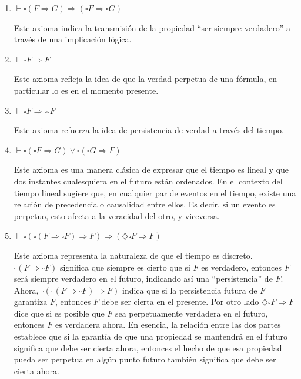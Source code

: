 \begin{enumerate}
    \item $ \vdash \square (F \Rightarrow G) \Rightarrow (\square F \Rightarrow \square G) $
    
    Este axioma indica la transmisión de la propiedad ``ser siempre verdadero'' a través de una implicación lógica.
    
    \item $ \vdash \square F \Rightarrow F $

    Este axioma refleja la idea de que la verdad perpetua de una fórmula, en particular lo es en el momento presente.
    
    \item $ \vdash \square F \Rightarrow \square\square F $

    Este axioma refuerza la idea de persistencia de verdad a través del tiempo.
    
    \item $ \vdash \square (\square F \Rightarrow G) \lor \square(\square G \Rightarrow F) $

    Este axioma es una manera clásica de expresar que el tiempo es lineal y que dos instantes cualesquiera en el futuro están ordenados. En el contexto del tiempo lineal sugiere que, en cualquier par de eventos en el tiempo, existe una relación de precedencia o causalidad entre ellos. Es decir, si un evento es perpetuo, esto afecta a la veracidad del otro, y viceversa.
    
    \item $ \vdash \square (\square(F \Rightarrow \square F)\Rightarrow F) \Rightarrow (\diamondsuit \square F \Rightarrow F) $

    Este axioma representa la naturaleza de que el tiempo es discreto. $\square(F \Rightarrow \square F)$ significa que siempre es cierto que si $F$ es verdadero, entonces $F$ será siempre verdadero en el futuro, indicando así una ``persistencia'' de $F$. Ahora, $\square (\square(F \Rightarrow \square F)\Rightarrow F)$ indica que si la persistencia futura de $F$ garantiza $F$, entonces $F$ debe ser cierta en el presente. Por otro lado $\diamondsuit \square F \Rightarrow F$ dice que si es posible que $F$ sea perpetuamente verdadera en el futuro, entonces $F$ es verdadera ahora. En esencia, la relación entre las dos partes establece que si la garantía de que una propiedad se mantendrá en el futuro significa que debe ser cierta ahora, entonces el hecho de que esa propiedad pueda ser perpetua en algún punto futuro también significa que debe ser cierta ahora.
    

\end{enumerate}
